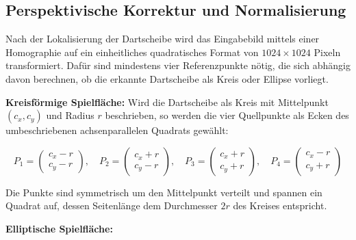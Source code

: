 \subsection{Perspektivische Korrektur und Normalisierung}

\label{sec:homography}

Nach der Lokalisierung der Dartscheibe wird das Eingabebild mittels einer Homographie auf ein einheitliches quadratisches Format von $1024 \times 1024$ Pixeln transformiert. Dafür sind mindestens vier Referenzpunkte nötig, die sich abhängig davon berechnen, ob die erkannte Dartscheibe als Kreis oder Ellipse vorliegt.

\textbf{Kreisförmige Spielfläche:} Wird die Dartscheibe als Kreis mit Mittelpunkt $(c_x, c_y)$ und Radius $r$ beschrieben, so werden die vier Quellpunkte als Ecken des umbeschriebenen achsenparallelen Quadrats gewählt:

\begin{equation}
P_1 = \begin{pmatrix} c_x - r \\ c_y - r \end{pmatrix}, \quad
P_2 = \begin{pmatrix} c_x + r \\ c_y - r \end{pmatrix}, \quad
P_3 = \begin{pmatrix} c_x + r \\ c_y + r \end{pmatrix}, \quad
P_4 = \begin{pmatrix} c_x - r \\ c_y + r \end{pmatrix}
\end{equation}

Die Punkte sind symmetrisch um den Mittelpunkt verteilt und spannen ein Quadrat auf, dessen Seitenlänge dem Durchmesser $2r$ des Kreises entspricht.

\textbf{Elliptische Spielfläche:} 



